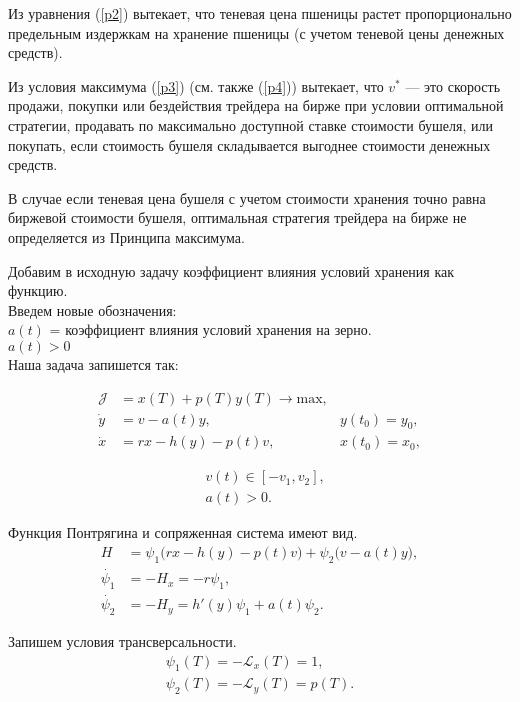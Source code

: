 {Из уравнения (\ref{p2}) вытекает, что теневая цена пшеницы растет пропорционально предельным издержкам на хранение пшеницы (с учетом теневой цены денежных средств).


Из условия максимума (\ref{p3}) (см. также (\ref{p4})) вытекает, что  ${v^*}$ --- это скорость продажи, покупки или бездействия трейдера на бирже при условии оптимальной стратегии, продавать по максимально доступной  ставке стоимости бушеля, или покупать, если стоимость бушеля складывается выгоднее стоимости денежных средств.


В случае если теневая цена бушеля с учетом стоимости хранения точно равна биржевой стоимости бушеля, оптимальная стратегия трейдера на бирже не определяется из Принципа максимума.




Добавим в исходную задачу коэффициент влияния условий хранения как функцию.\\
Введем новые обозначения:\\
${a(t)}$ = коэффициент влияния условий хранения на зерно.\\
$a(t) > 0$\\
 Наша задача запишется так:

\begin{align}
\mathcal{J} & = x(T) + p(T) y(T) \to \mathrm{max},\\
    \Dot{y} & = v - a(t) y, & y(t_{0}) = y_{0}, \\
    \Dot{x} & = r x - h(y) - p(t) v, & x(t_{0}) = x_{0}, 
\end{align}

\begin{align*}
    & v(t) \in [-v_{1}, v_{2}], \\
    & a(t) > 0.
\end{align*}

Функция Понтрягина и сопряженная система имеют вид. 
\begin{align}
    {H} & = \psi_{1} \big( r x- h(y) - p(t) v \big) + \psi_{2} \big( v - a(t)y \big),\\
    \Dot{\psi_{1}} & = -H_x = -r \psi_{1}, \label{p6}\\
    \Dot{\psi_{2}} & = -H_y = h'(y) \psi_{1} +  a(t) \psi_{2}.\label{p7}
\end{align} 

Запишем  условия трансверсальности.
\begin{align}
    {\psi_{1}(T)} = \mathcal{- L}_x(T)= 1,\\
    {\psi_{2}(T)} = \mathcal {- L}_y(T)= p(T).
\end{align} 


}
